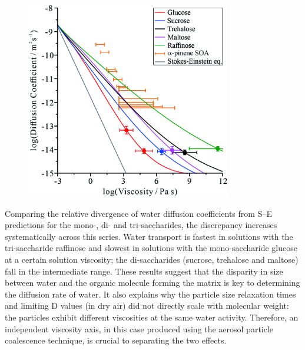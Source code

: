 \begin{figure}
    \centering
    \includegraphics[width=0.8\textwidth]{chapters/water_hopping/figures/f2.png}
    \label{fig:wat_diff_coef_corr}
\end{figure}


Comparing the relative divergence of water diffusion coefficients from S–E predictions for the mono-, di- and tri-saccharides, the discrepancy increases systematically across this series. Water transport is fastest in solutions with the tri-saccharide raffinose and slowest in solutions with the mono-saccharide glucose at a certain solution viscosity; the di-saccharides (sucrose, trehalose and maltose) fall in the intermediate range. These results suggest that the disparity in size between water and the organic molecule forming the matrix is key to determining the diffusion rate of water. It also explains why the particle size relaxation times and limiting D values (in dry air) did not directly scale with molecular weight: the particles exhibit different viscosities at the same water activity. Therefore, an independent viscosity axis, in this case produced using the aerosol particle coalescence technique, is crucial to separating the two effects.

